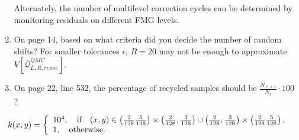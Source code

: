 \documentclass{article}
\begin{document}
\begin{enumerate}
    Alternately, the number of multilevel correction cycles can be determined by monitoring residuals on different FMG levels. 
    
    \item On page 14, based on what criteria did you decide the number of random shifts? For smaller tolerances $\epsilon$, $R=20$ may not be enough to approximate $V[\overline{\mathcal{Q}}^{QMC}_{L,R,reuse}]$.
    
    \item On page 22, line 532, the percentage of recycled samples should be $\frac{N_{\ell+1}}{N_\ell}\cdot 100$ ?
    
\end{enumerate}
$$
k(x,y) =
\left\{
\begin{array}{l}
10^4, \quad {\mbox {\rm if} } \quad (x,y) \in \left(
\frac{2}{128}\frac{5}{128}\right)\times\left(\frac{2}{128},\frac{3}{128}\right)\cup\left(
\frac{2}{128},\frac{3}{128}\right)\times\left( \frac{2}{128}\frac{5}{128}\right), \\
1, \quad {\mbox {\rm otherwise}}.
\end{array}
\right.
$$
\end{document}

